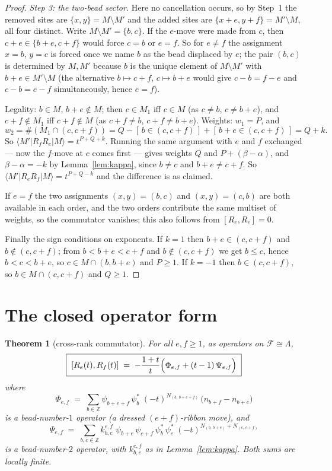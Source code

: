 \documentclass[11pt]{article}
\newtheorem{theorem}{Theorem}
\theoremstyle{definition}
\newcommand{\Z}{\mathbb{Z}}
\newcommand{\Lam}{\Lambda}
\newcommand{\F}{\mathcal{F}}
\begin{document}
\begin{proof}
\smallskip
\emph{Step 3: the two-bead sector.}  Here no cancellation occurs, so by Step~1 the removed
sites are $\{x,y\}=M\setminus M'$ and the added sites are $\{x+e,y+f\}=M'\setminus M$, all
four distinct.  Write $M\setminus M'=\{b,c\}$.  If the $e$-move were made from $c$, then
$c+e\in\{b+e,c+f\}$ would force $c=b$ or $e=f$.  So for $e\ne f$ the assignment
$x=b$, $y=c$ is forced once we name $b$ as the bead displaced by $e$; the pair $(b,c)$ is
determined by $M,M'$ because $b$ is the unique element of $M\setminus M'$ with
$b+e\in M'\setminus M$ (the alternative $b\mapsto c+f$, $c\mapsto b+e$ would give
$c-b=f-e$ and $c-b=e-f$ simultaneously, hence $e=f$).

Legality: $b\in M$, $b+e\notin M$; then $c\in M_1$ iff $c\in M$ (as $c\ne b$, $c\ne b+e$),
and $c+f\notin M_1$ iff $c+f\notin M$ (as $c+f\ne b$, $c+f\ne b+e$).  Weights:
$w_1=P$, and
\[
 w_2=\#(M_1\cap(c,c+f))=Q-[\,b\in(c,c+f)\,]+[\,b+e\in(c,c+f)\,]=Q+k .
\]
So $\langle M'|R_fR_e|M\rangle=t^{P+Q+k}$.  Running the same argument with $e$ and $f$
exchanged --- now the $f$-move at $c$ comes first --- gives weights $Q$ and
$P+(\beta-\alpha)$, and $\beta-\alpha=-k$ by Lemma~\ref{lem:kappa}, since $b\ne c$ and
$b+e\ne c+f$.  So $\langle M'|R_eR_f|M\rangle=t^{P+Q-k}$ and the difference is as claimed.

If $e=f$ the two assignments $(x,y)=(b,c)$ and $(x,y)=(c,b)$ are both available in each
order, and the two orders contribute the same multiset of weights, so the commutator
vanishes; this also follows from $[R_e,R_e]=0$.

Finally the sign conditions on exponents.  If $k=1$ then $b+e\in(c,c+f)$ and
$b\notin(c,c+f)$; from $b<b+e<c+f$ and $b\notin(c,c+f)$ we get $b\le c$, hence $b<c<b+e$,
so $c\in M\cap(b,b+e)$ and $P\ge1$.  If $k=-1$ then $b\in(c,c+f)$, so $b\in M\cap(c,c+f)$
and $Q\ge1$.
\end{proof}

\section{The closed operator form}

\begin{theorem}[cross-rank commutator]\label{thm:main}
For all $e,f\ge1$, as operators on $\F\cong\Lam$,
\[
 \boxed{\;[R_e(t),R_f(t)]\;=\;-\frac{1+t}{t}\Bigl(\Phi_{e,f}+(t-1)\,\Psi_{e,f}\Bigr)\;}
\]
where
\[
 \Phi_{e,f}\;=\;\sum_{b\in\Z}\psi_{b+e+f}\,\psi_b^{*}\;(-t)^{N_{(b,\,b+e+f)}}\,
        \bigl(n_{b+f}-n_{b+e}\bigr)
\]
is a bead-number-$1$ operator (a dressed $(e{+}f)$-ribbon move), and
\[
 \Psi_{e,f}\;=\;\sum_{b,c\in\Z}k^{e,f}_{b,c}\;
   \psi_{b+e}\,\psi_{c+f}\,\psi_b^{*}\,\psi_c^{*}\;
   (-t)^{N_{(b,\,b+e)}+N_{(c,\,c+f)}}
\]
is a bead-number-$2$ operator, with $k^{e,f}_{b,c}$ as in Lemma~\ref{lem:kappa}.  Both
sums are locally finite.
\end{theorem}
\end{document}
